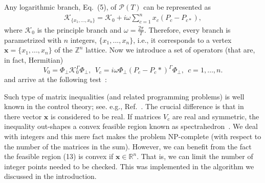 \documentclass[%
 aip,
 floatfix,
 amsmath,amssymb,
 reprint,%
]{revtex4-1}
\begin{document}
Any logarithmic branch, Eq.~(5), of $\mathcal{P}(T)$ can be represented as
\begin{align}
\mathcal{K}_{ \{x_1,...,x_{n}\}} = \mathcal{K}_0+ i \omega \sum_{c=1}^{n}  x_c \left( P_c -   P_{c*}\right),
\label{eq:candidates-LF}
\end{align}
where $\mathcal{K}_0$ is the  principle branch and $\omega = \frac{2\pi}{T}$. 
Therefore, every branch is parametrized with $n$ integers, $\{x_1,...,x_{n}\}$, i.e., it corresponds to a vertex $\mathbf{x}=\{x_1,...,x_{n}\}$ of the $\mathbb{Z}^{n}$ lattice. Now we introduce a set of operators (that are, in fact, Hermitian)
\begin{equation}
	V_0 = \Phi_{\perp} \mathcal{K}_0^\Gamma\Phi_{\perp}, ~~ V_c = i \omega \Phi_{\perp} (P_c - P_c*)^\Gamma\Phi_{\perp}, ~~ c = 1, \dots, n.
\end{equation}
and arrive at the following test~\cite{X1}:

\noindent{}

Such type of matrix inequalities (and related programming problems) is  well known in the control theory; see. e.g., Ref.~\cite{control}. The crucial difference is that in there  vector $\mathbf{x}$ is considered to be  real. If matrices $V_c$ are real and symmetric, the 
inequality out-shapes a convex feasible region known as spectrahedron~\cite{spectra}. We deal with integers and this mere fact makes the problem NP-complete (with respect to the number of the matrices in the sum). 
However, we can benefit from 
the fact the feasible region  (13) is convex if $\mathbf{x} \in \mathbb{R}^{n} $. That is, we can limit the number of integer points needed to be checked. 
This was implemented in the algorithm we discussed in the introduction. 
\end{document}
